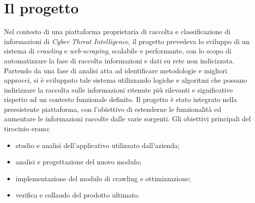 \section{Il progetto}

Nel contesto di una piattaforma proprietaria di raccolta e classificazione di informazioni di \emph{Cyber Threat Intelligence}, il progetto prevedeva lo sviluppo di un sistema di \emph{crawling} e \emph{web-scraping}, scalabile e performante, con lo scopo di automatizzare la fase di raccolta informazioni e dati su rete non indicizzata. Partendo da una fase di analisi atta ad identificare metodologie e migliori approcci, si è sviluppato tale sistema utilizzando logiche e algoritmi che possano indirizzare la raccolta sulle informazioni ritenute più rilevanti e significative rispetto ad un contesto funzionale definito.\newline{}
Il progetto è stato integrato nella preesistente piattaforma, con l’obiettivo di estenderne le funzionalità ed aumentare le informazioni raccolte dalle varie sorgenti.\newline{} Gli obiettivi principali del tirocinio erano: \newline{}
\begin{itemize}
	\item studio e analisi dell’applicativo utilizzato dall’azienda;
	\item analisi e progettazione del nuovo modulo;
	\item implementazione del modulo di crawling e ottimizzazione;
	\item verifica e collaudo del prodotto ultimato.
\end{itemize}
